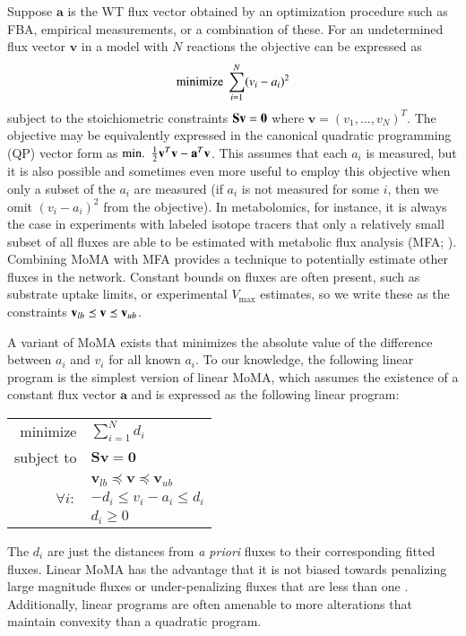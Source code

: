 Suppose $\mathbf{a}$ is the WT flux vector obtained by an optimization
procedure such as FBA, empirical measurements, or a combination of
these. For an undetermined flux vector $\mathbf{v}$ in a model with
$N$ reactions the objective can be expressed as
\[ \textnormal{minimize}\ \sum\limits_{i=1}^N (v_i-a_i)^2 \] 
subject to the stoichiometric constraints $\mathbf{S v}\nolinebreak
=\nolinebreak \mathbf{0}$ where $\mathbf{v} = (v_1, \ldots,
v_N)^T$. The objective may be equivalently expressed in the canonical
quadratic programming (QP) vector form as
$\textnormal{min.\ }\ \frac{1}{2}\mathbf{v}^T \mathbf{v}\nolinebreak
-\nolinebreak \mathbf{a}^T \mathbf{v}$. This assumes that each $a_i$
is measured, but it is also possible and sometimes even more useful to
employ this objective when only a subset of the $a_i$ are measured (if
$a_i$ is not measured for some $i$, then we omit $(v_i-a_i)^2$ from
the objective). In metabolomics, for instance, it is always the case
in experiments with labeled isotope tracers that only a relatively
small subset of all fluxes are able to be estimated with metabolic
flux analysis (MFA; \citealt{Shestov2013a}). Combining MoMA with MFA
provides a technique to potentially estimate other fluxes in the
network. Constant bounds on fluxes are often present, such as
substrate uptake limits, or experimental $V_{\max}$ estimates, so we
write these as the constraints $\mathbf{v}_{lb}\nolinebreak
\preceq\nolinebreak \mathbf{v}\nolinebreak \preceq \mathbf{v}_{ub}$.

A variant of MoMA exists that minimizes the absolute value of the
difference between $a_i$ and $v_i$ for all known $a_i$. To our
knowledge, the following linear program is the simplest version of
linear MoMA, which assumes the existence of a constant flux vector
$\mathbf{a}$ and is expressed as the following linear program:

\begin{center}
\begin{tabular}{rl}
minimize & $\sum\limits_{i=1}^N d_i$  \\
subject to & $\mathbf{S v} = \mathbf{0}$ \\
 & $\mathbf{v}_{lb} \preceq \mathbf{v} \preceq \mathbf{v}_{ub}$ \\
$\forall i:$ & $-d_i \le v_i-a_i \le d_i$ \\
 & $d_i \ge 0$
\end{tabular}
\end{center}

The $d_i$ are just the distances from \textit{a priori} fluxes to
their corresponding fitted fluxes.  Linear MoMA has the advantage that
it is not biased towards penalizing large magnitude fluxes or
under-penalizing fluxes that are less than one
\citep{Boyd2004,Shlomi2005}. Additionally, linear programs are often
amenable to more alterations that maintain convexity than a quadratic
program.

